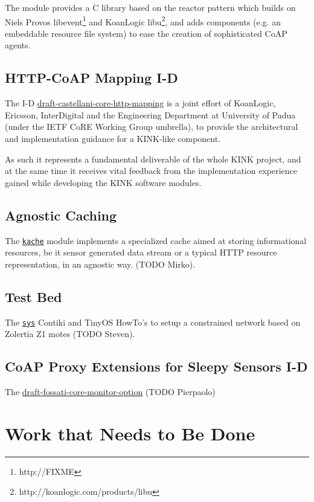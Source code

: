 \documentclass[12pt]{article}
\newcommand{\swmod}[1]{\mbox{\texttt{#1}}}
\begin{document}
The module provides a C library based on the reactor pattern which builds on Niels Provos libevent\footnote{http://FIXME} and KoanLogic libu\footnote{http://koanlogic.com/products/libu}, and adds components (e.g. an embeddable resource file system) to ease the creation of sophisticated CoAP agents.

\subsection{HTTP-CoAP Mapping I-D}
The I-D \href{http://tools.ietf.org/html/draft-castellani-core-http-mapping}{draft-castellani-core-http-mapping} is a joint effort of \mbox{KoanLogic}, \mbox{Ericsson}, \mbox{InterDigital} and the Engineering Department at University of Padua (under the IETF CoRE Working Group umbrella), to provide the architectural and implementation guidance for a KINK-like component.

As such it represents a fundamental deliverable of the whole KINK project, and at the same time it receives vital feedback from the implementation experience gained while developing the KINK software modules.

\subsection{Agnostic Caching}
The \href{https://github.com/koanlogic/webthings/bits/kache}{\swmod{kache}} module implements a specialized cache aimed at storing informational resources, be it sensor generated data stream or a typical HTTP resource representation, in an agnostic way. (TODO Mirko).

\subsection{Test Bed}
The \href{https://github.com/koanlogic/webthings/bits}{\swmod{sys}} Contiki and TinyOS HowTo's to setup a constrained network based on Zolertia Z1 motes (TODO Steven).

\subsection{CoAP Proxy Extensions for Sleepy Sensors I-D}
The \href{https://github.com/koanlogic/webthings/docs/}{draft-fossati-core-monitor-option}
(TODO Pierpaolo)

\section{Work that Needs to Be Done}
\end{document}
